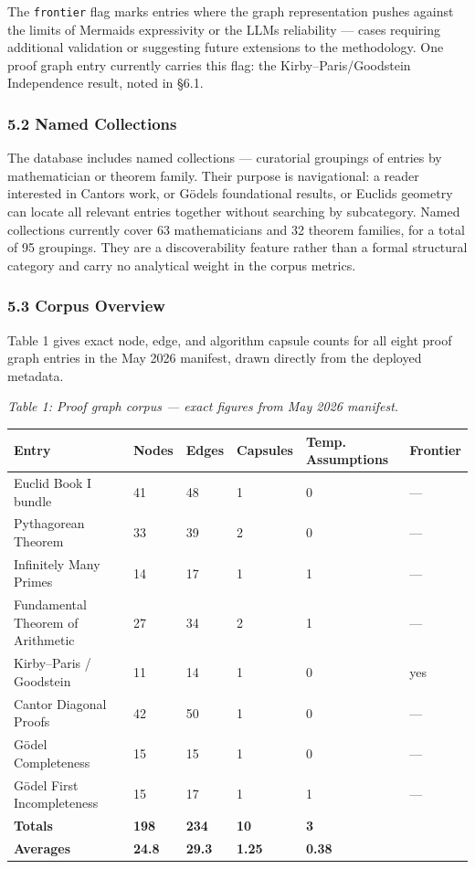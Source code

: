 \documentclass[
  11pt]{article}
\begin{document}
The \texttt{frontier} flag marks entries where the graph representation
pushes against the limits of Mermaid\textquotesingle s expressivity or
the LLM\textquotesingle s reliability --- cases requiring additional
validation or suggesting future extensions to the methodology. One proof
graph entry currently carries this flag: the Kirby--Paris/Goodstein
Independence result, noted in §6.1.

\hypertarget{52-named-collections}{%
\subsubsection{5.2 Named Collections}\label{52-named-collections}}

The database includes named collections --- curatorial groupings of
entries by mathematician or theorem family. Their purpose is
navigational: a reader interested in Cantor\textquotesingle s work, or
Gödel\textquotesingle s foundational results, or
Euclid\textquotesingle s geometry can locate all relevant entries
together without searching by subcategory. Named collections currently
cover 63 mathematicians and 32 theorem families, for a total of 95
groupings. They are a discoverability feature rather than a formal
structural category and carry no analytical weight in the corpus
metrics.

\hypertarget{53-corpus-overview}{%
\subsubsection{5.3 Corpus Overview}\label{53-corpus-overview}}

Table 1 gives exact node, edge, and algorithm capsule counts for all
eight proof graph entries in the May 2026 manifest, drawn directly from
the deployed metadata.

\emph{Table 1: Proof graph corpus --- exact figures from May 2026
manifest.}

\begin{longtable}[]{@{}llllll@{}}
\toprule\noalign{}
Entry & Nodes & Edges & Capsules & Temp. Assumptions & Frontier \\
\midrule\noalign{}
\endhead
\bottomrule\noalign{}
\endlastfoot
Euclid Book I bundle & 41 & 48 & 1 & 0 & --- \\
Pythagorean Theorem & 33 & 39 & 2 & 0 & --- \\
Infinitely Many Primes & 14 & 17 & 1 & 1 & --- \\
Fundamental Theorem of Arithmetic & 27 & 34 & 2 & 1 & --- \\
Kirby--Paris / Goodstein & 11 & 14 & 1 & 0 & yes \\
Cantor Diagonal Proofs & 42 & 50 & 1 & 0 & --- \\
Gödel Completeness & 15 & 15 & 1 & 0 & --- \\
Gödel First Incompleteness & 15 & 17 & 1 & 1 & --- \\
\textbf{Totals} & \textbf{198} & \textbf{234} & \textbf{10} & \textbf{3}
& \\
\textbf{Averages} & \textbf{24.8} & \textbf{29.3} & \textbf{1.25} &
\textbf{0.38} & \\
\end{longtable}
\end{document}
